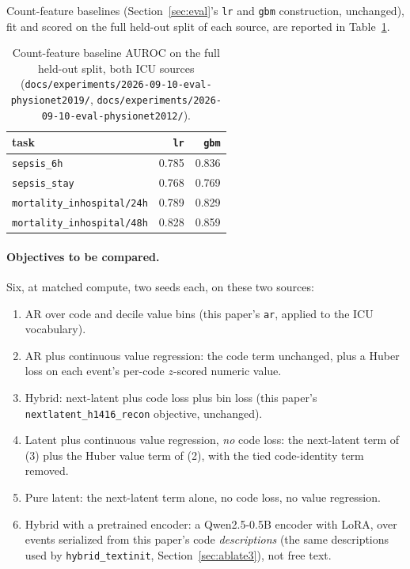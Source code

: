 \documentclass[11pt,a4paper]{article}
\newcommand{\code}[1]{\texttt{\small #1}}
\begin{document}
Count-feature baselines (Section~\ref{sec:eval}'s \code{lr} and \code{gbm}
construction, unchanged), fit and scored on the full held-out split of each
source, are reported in Table~\ref{tab:icubaselines}.

\begin{table}[h]
\centering\small
\caption{Count-feature baseline AUROC on the full held-out split, both ICU
sources (\code{docs/experiments/2026-09-10-eval-physionet2019/},
\code{docs/experiments/2026-09-10-eval-physionet2012/}).}
\label{tab:icubaselines}
\begin{tabular}{lrr}
\toprule
task & \code{lr} & \code{gbm} \\
\midrule
\code{sepsis\_6h} & 0.785 & 0.836 \\
\code{sepsis\_stay} & 0.768 & 0.769 \\
\code{mortality\_inhospital/24h} & 0.789 & 0.829 \\
\code{mortality\_inhospital/48h} & 0.828 & 0.859 \\
\bottomrule
\end{tabular}
\end{table}

\paragraph{Objectives to be compared.} Six, at matched compute, two seeds
each, on these two sources:
\begin{enumerate}[leftmargin=*,itemsep=2pt,topsep=3pt]
\item AR over code and decile value bins (this paper's \code{ar}, applied to
      the ICU vocabulary).
\item AR plus continuous value regression: the code term unchanged, plus a
      Huber loss on each event's per-code $z$-scored numeric value.
\item Hybrid: next-latent plus code loss plus bin loss (this paper's
      \code{nextlatent\_h1416\_recon} objective, unchanged).
\item Latent plus continuous value regression, \emph{no} code loss: the
      next-latent term of (3) plus the Huber value term of (2), with the
      tied code-identity term removed.
\item Pure latent: the next-latent term alone, no code loss, no value
      regression.
\item Hybrid with a pretrained encoder: a Qwen2.5-0.5B encoder with LoRA,
      over events serialized from this paper's code
      \emph{descriptions} (the same descriptions used by
      \code{hybrid\_textinit}, Section~\ref{sec:ablate3}), not free text.
\end{enumerate}
\end{document}
